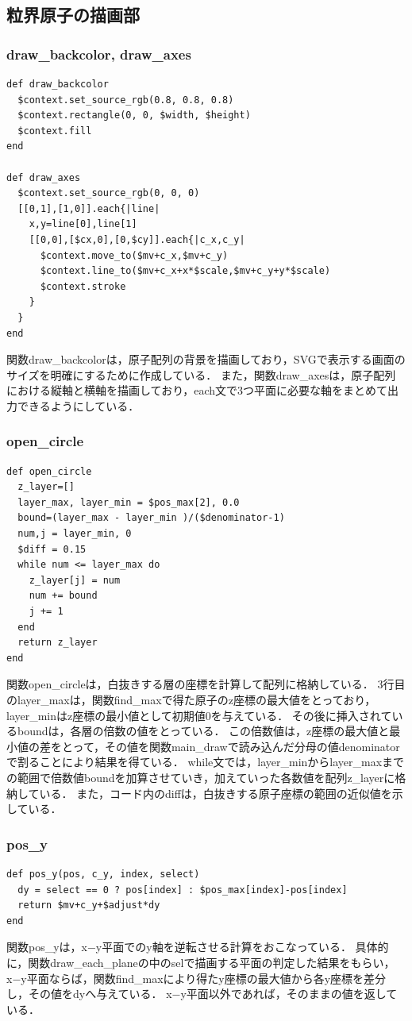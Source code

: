 \subsection{粒界原子の描画部}
\subsubsection{draw\_backcolor, draw\_axes}\begin{lstlisting}[style=customRuby,basicstyle={\scriptsize\ttfamily}]
def draw_backcolor
  $context.set_source_rgb(0.8, 0.8, 0.8)
  $context.rectangle(0, 0, $width, $height)
  $context.fill
end

def draw_axes
  $context.set_source_rgb(0, 0, 0)
  [[0,1],[1,0]].each{|line|
    x,y=line[0],line[1]
    [[0,0],[$cx,0],[0,$cy]].each{|c_x,c_y|
      $context.move_to($mv+c_x,$mv+c_y)
      $context.line_to($mv+c_x+x*$scale,$mv+c_y+y*$scale)
      $context.stroke
    }
  }
end
\end{lstlisting}
関数draw\_backcolorは，原子配列の背景を描画しており，SVGで表示する画面のサイズを明確にするために作成している．
また，関数draw\_axesは，原子配列における縦軸と横軸を描画しており，each文で3つ平面に必要な軸をまとめて出力できるようにしている．

\subsubsection{open\_circle}\begin{lstlisting}[style=customRuby,basicstyle={\scriptsize\ttfamily}]
def open_circle
  z_layer=[]
  layer_max, layer_min = $pos_max[2], 0.0
  bound=(layer_max - layer_min )/($denominator-1)
  num,j = layer_min, 0
  $diff = 0.15
  while num <= layer_max do
    z_layer[j] = num
    num += bound
    j += 1
  end
  return z_layer
end
\end{lstlisting}
関数open\_circleは，白抜きする層の座標を計算して配列に格納している．
3行目のlayer\_maxは，関数find\_maxで得た原子のz座標の最大値をとっており，layer\_minはz座標の最小値として初期値0を与えている．
その後に挿入されているboundは，各層の倍数の値をとっている．
この倍数値は，z座標の最大値と最小値の差をとって，その値を関数main\_drawで読み込んだ分母の値denominatorで割ることにより結果を得ている．
while文では，layer\_minからlayer\_maxまでの範囲で倍数値boundを加算させていき，加えていった各数値を配列z\_layerに格納している．
また，コード内のdiffは，白抜きする原子座標の範囲の近似値を示している．

\subsubsection{pos\_y}\begin{lstlisting}[style=customRuby,basicstyle={\scriptsize\ttfamily}]
def pos_y(pos, c_y, index, select)
  dy = select == 0 ? pos[index] : $pos_max[index]-pos[index]
  return $mv+c_y+$adjust*dy
end
\end{lstlisting}
関数pos\_yは，x−y平面でのy軸を逆転させる計算をおこなっている．
具体的に，関数draw\_each\_planeの中のselで描画する平面の判定した結果をもらい，x−y平面ならば，関数find\_maxにより得たy座標の最大値から各y座標を差分し，その値をdyへ与えている．
x−y平面以外であれば，そのままの値を返している．

